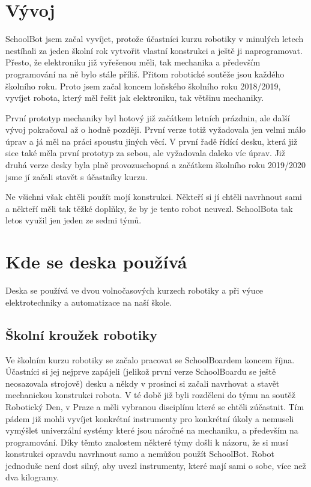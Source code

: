 \documentclass{template/socthesis}
\begin{document}
\section{Vývoj}

SchoolBot jsem začal vyvíjet, protože účastníci kurzu robotiky v minulých letech nestíhali za jeden školní rok vytvořit vlastní konstrukci a ještě ji naprogramovat. Přesto, že elektroniku již vyřešenou měli, tak mechanika a především programování na ně bylo stále příliš. Přitom robotické soutěže jsou  každého školního roku. Proto jsem začal koncem loňského školního roku 2018/2019, vyvíjet robota, který měl řešit jak elektroniku, tak většinu mechaniky. 

První prototyp mechaniky byl hotový již začátkem letních prázdnin, ale další vývoj pokračoval až o hodně později. První verze totiž vyžadovala jen velmi málo úprav a já měl na práci spoustu jiných věcí. V první řadě řídící desku, která již sice také měla první prototyp za sebou, ale vyžadovala daleko víc úprav. Již druhá verze desky byla plně provozuschopná a začátkem školního roku 2019/2020 jsme jí začali stavět s účastníky kurzu.

 Ne všichni však chtěli použít mojí konstrukci. Někteří si jí chtěli navrhnout sami a někteří měli tak těžké doplňky, že by je tento robot neuvezl. 
SchoolBota tak letos využil jen jeden ze sedmi týmů.

\section{Kde se deska používá}
Deska se používá ve dvou volnočasových kurzech robotiky a při výuce elektrotechniky a automatizace na naší škole.


\subsection{Školní kroužek robotiky}

Ve školním kurzu robotiky se začalo pracovat se SchoolBoardem koncem října. Účastníci si jej nejprve zapájeli (jelikož první verze SchoolBoardu se ještě neosazovala strojově) desku a někdy v prosinci si začali navrhovat a stavět mechanickou konstrukci robota. V té době již byli rozděleni do týmu na soutěž Robotický Den, v Praze a měli vybranou disciplínu které se chtěli zúčastnit. Tím pádem již mohli vyvíjet konkrétní instrumenty pro konkrétní úkoly a nemuseli vymýšlet univerzální systémy které jsou náročné na mechaniku, a především na programování. Díky těmto znalostem některé týmy došli k názoru, že si musí konstrukci opravdu navrhnout samo a nemůžou použít SchoolBot. Robot jednoduše není dost silný, aby uvezl instrumenty, které mají sami o sobe, více než dva kilogramy.
\end{document}
